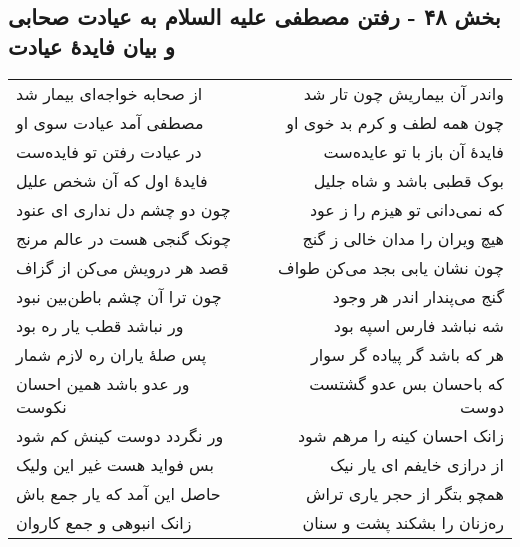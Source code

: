 \begin{center}
\section*{بخش ۴۸ - رفتن مصطفی علیه السلام به عیادت صحابی و بیان فایدهٔ عیادت}
\label{sec:sh048}
\begin{longtable}{l p{0.5cm} r}
از صحابه خواجه‌ای بیمار شد
&&
واندر آن بیماریش چون تار شد
\\
مصطفی آمد عیادت سوی او
&&
چون همه لطف و کرم بد خوی او
\\
در عیادت رفتن تو فایده‌ست
&&
فایدهٔ آن باز با تو عایده‌ست
\\
فایدهٔ اول که آن شخص علیل
&&
بوک قطبی باشد و شاه جلیل
\\
چون دو چشم دل نداری ای عنود
&&
که نمی‌دانی تو هیزم را ز عود
\\
چونک گنجی هست در عالم مرنج
&&
هیچ ویران را مدان خالی ز گنج
\\
قصد هر درویش می‌کن از گزاف
&&
چون نشان یابی بجد می‌کن طواف
\\
چون ترا آن چشم باطن‌بین نبود
&&
گنج می‌پندار اندر هر وجود
\\
ور نباشد قطب یار ره بود
&&
شه نباشد فارس اسپه بود
\\
پس صلهٔ یاران ره لازم شمار
&&
هر که باشد گر پیاده گر سوار
\\
ور عدو باشد همین احسان نکوست
&&
که باحسان بس عدو گشتست دوست
\\
ور نگردد دوست کینش کم شود
&&
زانک احسان کینه را مرهم شود
\\
بس فواید هست غیر این ولیک
&&
از درازی خایفم ای یار نیک
\\
حاصل این آمد که یار جمع باش
&&
همچو بتگر از حجر یاری تراش
\\
زانک انبوهی و جمع کاروان
&&
ره‌زنان را بشکند پشت و سنان
\\
\end{longtable}
\end{center}

